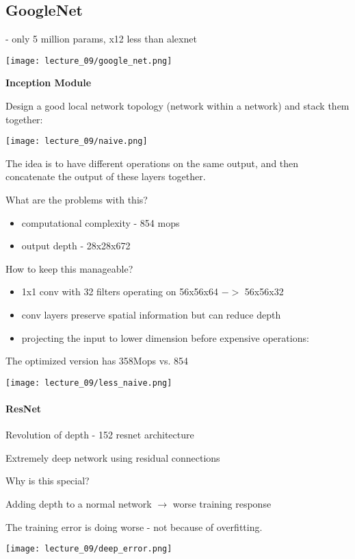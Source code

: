 \subsection{GoogleNet}

- only 5 million params, x12 less than alexnet

\texttt{[image: lecture\_09/google\_net.png]}

\textbf{Inception Module}

Design a good local network topology (network within a network) and stack them together:

\texttt{[image: lecture\_09/naive.png]}

The idea is to have different operations on the same output, and then concatenate the output of these layers together.

What are the problems with this? 
\begin{itemize}
\item computational complexity - 854 mops
\item output depth - 28x28x672
\end{itemize}

How to keep this manageable?
\begin{itemize}
\item 1x1 conv with 32 filters operating on 56x56x64 $->$ 56x56x32 
\item conv layers preserve spatial information but can reduce depth
\item projecting the input to lower dimension before expensive operations:
\end{itemize}

The optimized version has 358Mops vs. 854

\texttt{[image: lecture\_09/less\_naive.png]}

\paragraph{ResNet}

Revolution of depth - 152 resnet architecture

Extremely deep network using residual connections

Why is this special? 

Adding depth to a normal network $\rightarrow$ worse training response

The training error is doing worse - not because of overfitting.

\texttt{[image: lecture\_09/deep\_error.png]}

